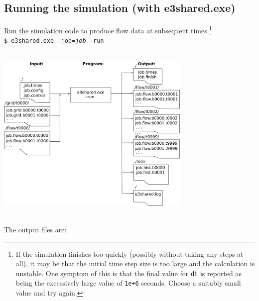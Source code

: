 \documentclass[12pt,a4paper,twoside]{article}
\begin{document}
\subsection{Running the simulation (with e3shared.exe)} 
Run the simulation code to produce flow data at subsequent times.\footnote{If the simulation
finishes too quickly (possibly without taking any steps at all),
it may be that the initial time step size is too large and the calculation is unstable.
One symptom of this is that the final value for \texttt{dt} is reported as being
the excessively large value of \texttt{1e+6} seconds.
Choose a suitably small value and try again.}\\ 
         \texttt{\$ e3shared.exe --job=\textit{job} --run}\\
         \vspace{0.25cm} \\
         \centerline{\includegraphics[width=0.7\textwidth]{figs/running-sim.png}}\\
         The output files are:
\end{document}
